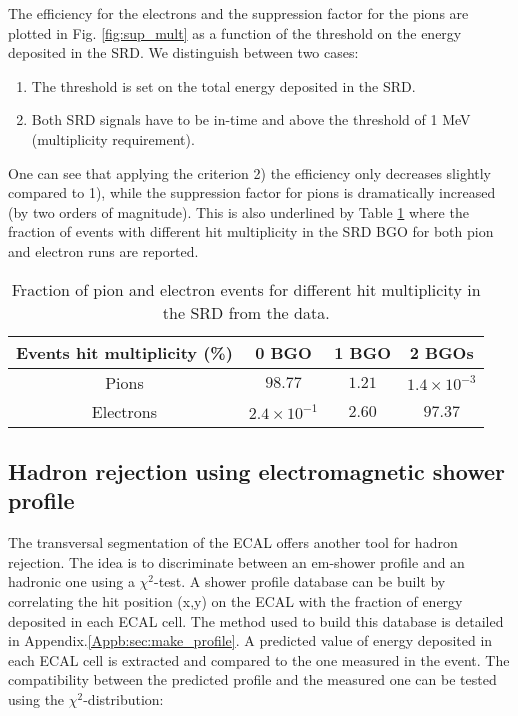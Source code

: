 The efficiency for the electrons and the suppression factor for the pions are plotted in Fig. \ref{fig:sup_mult} as a function of the threshold on the energy deposited in the SRD. We distinguish between two cases:
\begin{enumerate}
\item The threshold is set on the total energy deposited in the SRD.
\item Both SRD signals have to be in-time and above the threshold of 1 MeV (multiplicity requirement).
\end{enumerate}
One can see that applying the criterion 2) the efficiency only decreases slightly compared to 1), while the suppression factor for pions is dramatically increased (by two orders of magnitude).
This is also underlined by Table  \ref{tab:hits} where the fraction of events with different hit multiplicity in the SRD BGO for both pion and electron runs are reported.

\begin{table}[hbt!]
\begin{center}
\begin{tabular}{cccc}
Events hit multiplicity  (\%) & 0 BGO  & 1 BGO & 2 BGOs\\
\hline
Pions & $98.77$ & $1.21$ & $1.4\times10^{-3}$  \\
Electrons & $2.4\times10^{-1}$  & $2.60$ & $97.37$ \\
\end{tabular}
\end{center}
\caption[Fraction of pion and electron events for different hit multiplicity in the SRD from the data]{Fraction of pion and electron events for different hit multiplicity in the SRD from the data.}
\label{tab:hits}

\end{table}

\FloatBarrier\noindent
\subsection{Hadron rejection using electromagnetic shower profile}
\label{ch3:sec:bkg-ecal-profile}

The transversal segmentation of the ECAL offers another tool for hadron rejection. The idea is to discriminate between an em-shower profile and an hadronic one using a $\chi^2$-test. A shower profile database can be built by correlating the hit position (x,y) on the ECAL with the fraction of energy deposited in each ECAL cell. The method used to build this database is detailed in Appendix.\ref{Appb:sec:make_profile}. A predicted value of energy deposited in each ECAL cell is extracted and compared to the one measured in the event. The compatibility between the predicted profile and the measured one can be tested using the $\chi^2$-distribution:

